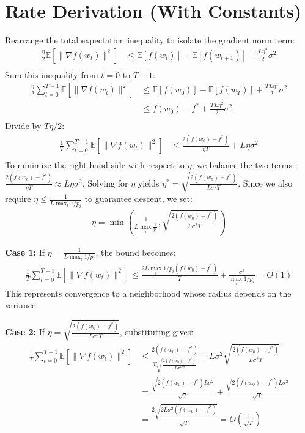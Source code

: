 \documentclass{article}
\begin{document}
\section*{Rate Derivation (With Constants)}
Rearrange the total expectation inequality to isolate the gradient norm term:
\begin{align*}
\frac{\eta}{2} \mathbb{E}[\|\nabla f(w_t)\|^2] &\leq \mathbb{E}[f(w_t)] - \mathbb{E}[f(w_{t+1})] + \frac{L \eta^2}{2} \sigma^2 \tag{Rearrange} \\ %
\end{align*}
Sum this inequality from $t=0$ to $T-1$:
\begin{align*}
\frac{\eta}{2} \sum_{t=0}^{T-1} \mathbb{E}[\|\nabla f(w_t)\|^2] &\leq \mathbb{E}[f(w_0)] - \mathbb{E}[f(w_T)] + \frac{T L \eta^2}{2} \sigma^2 \tag{Telescoping sum} \\ %
&\leq f(w_0) - f^* + \frac{T L \eta^2}{2} \sigma^2 \tag{Lower bound $f(w_T) \geq f^*$} \\ %
\end{align*}
Divide by $T \eta / 2$:
\begin{align*}
\frac{1}{T} \sum_{t=0}^{T-1} \mathbb{E}[\|\nabla f(w_t)\|^2] &\leq \frac{2(f(w_0) - f^*)}{\eta T} + L \eta \sigma^2 \tag{Divide by $T \eta / 2$} \\ %
\end{align*}
To minimize the right hand side with respect to $\eta$, we balance the two terms: $\frac{2(f(w_0)-f^*)}{\eta T} \approx L \eta \sigma^2$. Solving for $\eta$ yields $\eta^* = \sqrt{\frac{2(f(w_0)-f^*)}{L \sigma^2 T}}$. Since we also require $\eta \leq \frac{1}{L \max_i 1/p_i}$ to guarantee descent, we set:
\begin{align*}
\eta = \min \left( \frac{1}{L \max_i \frac{1}{p_i}}, \sqrt{\frac{2(f(w_0)-f^*)}{L \sigma^2 T}} \right)
\end{align*}

\textbf{Case 1:} If $\eta = \frac{1}{L \max_i 1/p_i}$, the bound becomes:
\begin{align*}
\frac{1}{T} \sum_{t=0}^{T-1} \mathbb{E}[\|\nabla f(w_t)\|^2] \leq \frac{2L \max_i 1/p_i (f(w_0)-f^*)}{T} + \frac{\sigma^2}{\max_i 1/p_i} = O(1)
\end{align*}
This represents convergence to a neighborhood whose radius depends on the variance.

\textbf{Case 2:} If $\eta = \sqrt{\frac{2(f(w_0)-f^*)}{L \sigma^2 T}}$, substituting gives:
\begin{align*}
\frac{1}{T} \sum_{t=0}^{T-1} \mathbb{E}[\|\nabla f(w_t)\|^2] &\leq \frac{2(f(w_0)-f^*)}{T \sqrt{\frac{2(f(w_0)-f^*)}{L \sigma^2 T}}} + L \sigma^2 \sqrt{\frac{2(f(w_0)-f^*)}{L \sigma^2 T}} \\
&= \frac{\sqrt{2(f(w_0)-f^*) L \sigma^2}}{\sqrt{T}} + \frac{\sqrt{2(f(w_0)-f^*) L \sigma^2}}{\sqrt{T}} \\
&= \frac{2\sqrt{2 L \sigma^2 (f(w_0)-f^*)}}{\sqrt{T}} = O\left(\frac{1}{\sqrt{T}}\right)
\end{align*}
\end{document}

